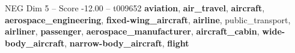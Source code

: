 \begin{textsample}{NEG Dim 5 – Score -12.00 – t009652}  \label{ex:f5_neg_030}
\textbf{aviation}, \textbf{air\_travel}, \textbf{aircraft}, \textbf{aerospace\_engineering}, \textbf{fixed-wing\_aircraft}, \textbf{airline}, public\_transport, \textbf{airliner}, \textbf{passenger}, \textbf{aerospace\_manufacturer}, \textbf{aircraft\_cabin}, \textbf{wide-body\_aircraft}, \textbf{narrow-body\_aircraft}, \textbf{flight}

\end{textsample}

